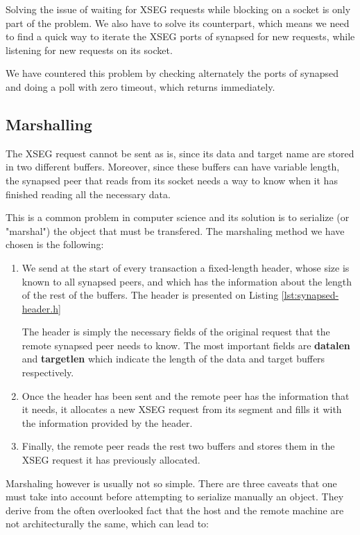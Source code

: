 Solving the issue of waiting for XSEG requests while blocking on a socket is 
only part of the problem. We also have to solve its counterpart, which means we 
need to find a quick way to iterate the XSEG ports of synapsed for new 
requests, while listening for new requests on its socket.

We have countered this problem by checking alternately the ports of synapsed 
and doing a poll with zero timeout, which returns immediately.

\subsection{Marshalling}

The XSEG request cannot be sent as is, since its data and target name are 
stored in two different buffers. Moreover, since these buffers can have 
variable length, the synapsed peer that reads from its socket needs a way to 
know when it has finished reading all the necessary data.

This is a common problem in computer science and its solution is to serialize 
(or "marshal") the object that must be transfered. The marshaling method we 
have chosen is the following:

\begin{enumerate}
	\item We send at the start of every transaction a fixed-length header, 
		whose size is known to all synapsed peers, and which has the 
		information about the length of the rest of the buffers.  The 
		header is presented on Listing \ref{lst:synapsed-header.h}


		The header is simply the necessary fields of the original 
		request that the remote synapsed peer needs to know. The most 
		important fields are \textbf{datalen} and \textbf{targetlen} 
		which indicate the length of the data and target buffers 
		respectively.
	\item Once the header has been sent and the remote peer has the 
		information that it needs, it allocates a new XSEG request from 
		its segment and fills it with the information provided by the 
		header.
	\item Finally, the remote peer reads the rest two buffers and stores 
		them in the XSEG request it has previously allocated.
\end{enumerate}

Marshaling however is usually not so simple. There are three caveats that one 
must take into account before attempting to serialize manually an object. They 
derive from the often overlooked fact that the host and the remote machine are 
not architecturally the same, which can lead to:

